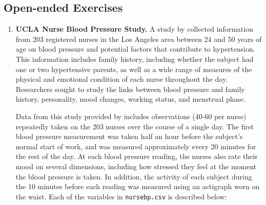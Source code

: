 \documentclass[
]{krantz}
\begin{document}
\hypertarget{open-ended-exercises-4}{%
\subsection{Open-ended Exercises}\label{open-ended-exercises-4}}

\begin{enumerate}
\def\labelenumi{\arabic{enumi}.}
\item
  \textbf{UCLA Nurse Blood Pressure Study.} A study by \citet{Goldstein2000} collected information from 203 registered nurses in the Los Angeles area between 24 and 50 years of age on blood pressure and potential factors that contribute to hypertension. This information includes family history, including whether the subject had one or two hypertensive parents, as well as a wide range of measures of the physical and emotional condition of each nurse throughout the day. Researchers sought to study the links between blood pressure and family history, personality, mood changes, working status, and menstrual phase.

  Data from this study provided by \citet{Weiss2005} includes observations (40-60 per nurse) repeatedly taken on the 203 nurses over the course of a single day. The first blood pressure measurement was taken half an hour before the subject's normal start of work, and was measured approximately every 20 minutes for the rest of the day. At each blood pressure reading, the nurses also rate their mood on several dimensions, including how stressed they feel at the moment the blood pressure is taken. In addition, the activity of each subject during the 10 minutes before each reading was measured using an actigraph worn on the waist. Each of the variables in \texttt{nursebp.csv} is described below:


\end{enumerate}
\end{document}
